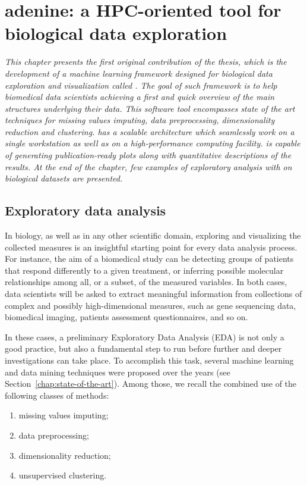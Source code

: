 
\chapter{{\sc adenine}: a HPC-oriented tool for biological data exploration} \label{chap:adenine}

\begin{displayquote}
\textit{This chapter presents the first original contribution of the thesis, which is the 	 development of a machine learning framework designed for biological data exploration and visualization called \ade.
The goal of such framework is to help biomedical data scientists achieving a first and quick overview of the main structures underlying their data.
This software tool encompasses state of the art techniques for missing values imputing, data preprocessing, dimensionality reduction and clustering.
\ade has a scalable architecture which seamlessly work on a single workstation as well as on a high-performance computing facility.
\ade is capable of generating publication-ready plots along with quantitative descriptions of the results.
At the end of the chapter, few examples of exploratory analysis with \ade on biological datasets are presented.}
\end{displayquote}


\section{Exploratory data analysis} \label{sec:data_exploration}
In biology, as well as in any other scientific domain, exploring and visualizing the collected measures is an insightful starting point for every data analysis process.
For instance, the aim of a biomedical study can be detecting groups of patients that respond differently to a given treatment, or inferring possible molecular relationships among all, or a subset, of the measured variables.
In both cases, data scientists will be asked to extract meaningful information from collections of complex and possibly high-dimensional measures, such as gene sequencing data, biomedical imaging, patients assessment questionnaires, and so on.

In these cases, a preliminary Exploratory Data Analysis (\ac{EDA}) is not only a good practice, but also a fundamental step to run before further and deeper investigations can take place.
To accomplish this task, several machine learning and data mining techniques were proposed over the years (see Section~\ref{chap:state-of-the-art}).
Among those, we recall the combined use of the following classes of methods:
\begin{enumerate}
  \item missing values imputing;
  \item data preprocessing;
  \item dimensionality reduction;
  \item unsupervised clustering.
\end{enumerate}

